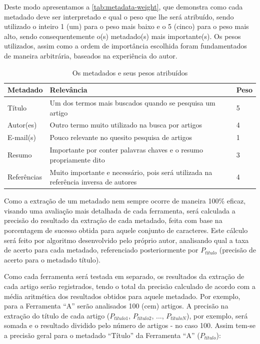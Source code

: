 Deste modo apresentamos a \autoref{tab:metadata-weight}, que demonstra como cada metadado deve ser interpretado e qual o peso que lhe será atribuído, sendo utilizado o inteiro 1 (um) para o peso mais baixo e o 5 (cinco) para o peso mais alto, sendo consequentemente o(s) metadado(s) mais importante(s). Os pesos utilizados, assim como a ordem de importância escolhida foram fundamentados de maneira arbitrária, baseados na experiência do autor.


\begin{table}
    \caption{Os metadados e seus pesos atribuídos}
    \begin{center}
        \begin{tabular}{|p{3cm}|p{8cm}|C{1cm}|}
            \hline \textbf{Metadado} & \textbf{Relevância} & \textbf{Peso} \\ 
            \hline Título & Um dos termos mais buscados quando se pesquisa um artigo & 5 \\
            \hline Autor(es) & Outro termo muito utilizado na busca por artigos & 4 \\
            \hline E-mail(s) & Pouco relevante no quesito pesquisa de artigos & 1 \\
            \hline Resumo & Importante por conter palavras chaves e o resumo propriamente dito & 3 \\
            \hline Referências & Muito importante e necessário, pois será utilizada na referência inversa de autores & 4 \\
            \hline 
        \end{tabular} 
    \end{center}
    \label{tab:metadata-weight}
\end{table}

Como a extração de um metadado nem sempre ocorre de maneira 100\% eficaz, visando uma avaliação mais detalhada de cada ferramenta, será calculada a precisão do resultado da extração de cada metadado, feita com base na porcentagem de sucesso obtida para aquele conjunto de caracteres. Este cálculo será feito por algoritmo desenvolvido pelo próprio autor, analisando qual a taxa de acerto para cada metadado, referenciado posteriormente por $P_{título}$ (precisão de acerto para o metadado título).


Como cada ferramenta será testada em separado, os resultados da extração de cada artigo serão registrados, tendo o total da precisão calculado de acordo com a média aritmética dos resultados obtidos para aquele metadado. Por exemplo, para a Ferramenta ``A'' serão analisados 100 (cem) artigos. A precisão na extração do título de cada artigo ($P_{título1}$, $P_{título2}$, ..., $P_{títuloN}$), por exemplo, será somada e o resultado dividido pelo número de artigos - no caso 100. Assim tem-se a precisão geral para o metadado ``Título'' da Ferramenta ``A'' ($P_{título}$):

